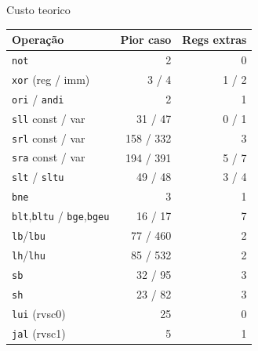 \documentclass[aspectratio=169]{beamer} %
\begin{document}
\begin{frame}{Custo teorico}
    \centering\scriptsize
    \begin{tabular}{lrr}
        \toprule
        \textbf{Operação} & \textbf{Pior caso} & \textbf{Regs extras} \\
        \midrule
        \texttt{not}                       & 2        & 0 \\
        \texttt{xor} (reg / imm)           & 3 / 4    & 1 / 2 \\
        \texttt{ori} / \texttt{andi}       & 2        & 1 \\
        \texttt{sll} const / var           & 31 / 47  & 0 / 1 \\
        \texttt{srl} const / var           & 158 / 332 & 3 \\
        \texttt{sra} const / var           & 194 / 391 & 5 / 7 \\
        \texttt{slt} / \texttt{sltu}       & 49 / 48  & 3 / 4 \\
        \texttt{bne}                       & 3        & 1 \\
        \texttt{blt},\texttt{bltu} / \texttt{bge},\texttt{bgeu} & 16 / 17 & 7 \\
        \texttt{lb}/\texttt{lbu}           & 77 / 460 & 2 \\
        \texttt{lh}/\texttt{lhu}           & 85 / 532 & 2 \\
        \texttt{sb}                        & 32 / 95  & 3 \\
        \texttt{sh}                        & 23 / 82  & 3 \\
        \texttt{lui} (rvsc0)               & 25       & 0 \\
        \texttt{jal} (rvsc1)               & 5        & 1 \\
        \bottomrule
    \end{tabular}
\end{frame}
\end{document}

